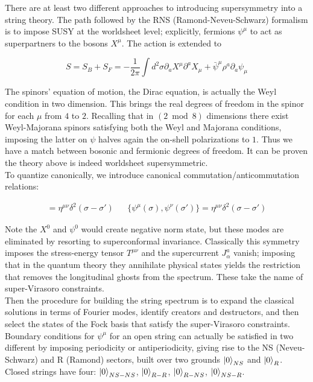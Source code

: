 \documentclass[11pt,a4paper,twoside,openright]{book}
\begin{document}
There are at least two different approaches to introducing supersymmetry into a string theory. The path followed by the RNS (Ramond-Neveu-Schwarz) formalism is to impose SUSY at the worldsheet level; explicitly, fermions $\psi^\mu$ to act as superpartners to the bosons $X^\mu$. The action is extended to

\begin{equation}
	S = S_B + S_F = -\frac{1}{2\pi} \int d^2\sigma \partial_a X^\mu \partial^a X_\mu + \bar \psi^\mu \rho^a \partial_a \psi_\mu
\end{equation}

The spinors' equation of motion, the Dirac equation, is actually the Weyl condition in two dimension. This brings the real degrees of freedom in the spinor for each $\mu$ from $4$ to $2$. Recalling that in $(2\bmod 8)$ dimensions there exist Weyl-Majorana spinors satisfying both the Weyl and Majorana conditions, imposing the latter on $\psi$ halves again the on-shell polarizations to $1$. Thus we have a match between bosonic and fermionic degrees of freedom. It can be proven the theory above is indeed worldsheet supersymmetric.\\

To quantize canonically, we introduce canonical commutation/anticommutation relations:

\begin{align}
	[X^\mu(\sigma),X^\nu(\sigma')] = \eta^{\mu\nu} \delta^2(\sigma-\sigma') && \{\psi^\mu(\sigma),\psi^\nu(\sigma')\} = \eta^{\mu\nu} \delta^2(\sigma-\sigma')
\end{align}

Note the $X^0$ and $\psi^0$ would create negative norm state, but these modes are eliminated by resorting to superconformal invariance. Classically this symmetry imposes the stress-energy tensor $T^{\mu\nu}$ and the supercurrent $J^a_\alpha$ vanish; imposing that in the quantum theory they annihilate physical states yields the restriction that removes the longitudinal ghosts from the spectrum. These take the name of super-Virasoro constraints.\\

Then the procedure for building the string spectrum is to expand the classical solutions in terms of Fourier modes, identify creators and destructors, and then select the states of the Fock basis that satisfy the super-Virasoro constraints.\\

Boundary conditions for $\psi^\mu$ for an open string can actually be satisfied in two different by imposing periodicity or antiperiodicity, giving rise to the NS (Neveu-Schwarz) and R (Ramond) sectors, built over two grounds $\ket{0}_{NS}$ and $\ket{0}_R$. Closed strings have four: $\ket{0}_{NS-NS}$, $\ket{0}_{R-R}$, $\ket{0}_{R-NS}$, $\ket{0}_{NS-R}$.
\end{document}
